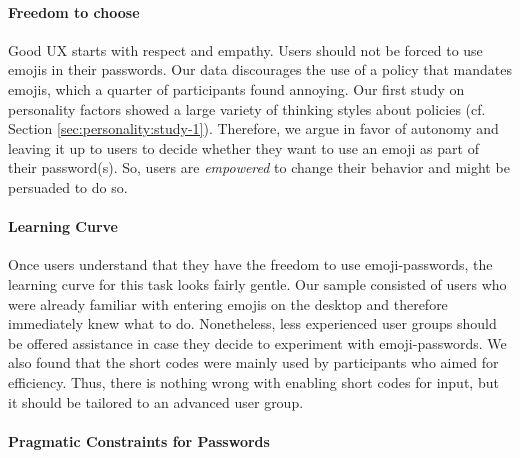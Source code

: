 \paragraph{Freedom to choose} Good UX starts with respect and empathy. Users should not be forced to use emojis in their passwords. Our data discourages the use of a policy that mandates emojis, which a quarter of participants found annoying. Our first study on personality factors showed a large variety of thinking styles about policies (cf. Section \ref{sec:personality:study-1}). Therefore, we argue in favor of autonomy and leaving it up to users to decide whether they want to use an emoji as part of their password(s). So, users are \textit{empowered} to change their behavior and might be persuaded to do so. 

\paragraph{Learning Curve} Once users understand that they have the freedom to use emoji-passwords, the learning curve for this task looks fairly gentle. Our sample consisted of users who were already familiar with entering emojis on the desktop and therefore immediately knew what to do. Nonetheless, less experienced user groups should be offered assistance in case they decide to experiment with emoji-passwords. We also found that the short codes were mainly used by participants who aimed for efficiency. Thus, there is nothing wrong with enabling short codes for input, but it should be tailored to an advanced user group. 


\paragraph{Pragmatic Constraints for Passwords}\label{sec:emojipasswords:unique-constraints} 

